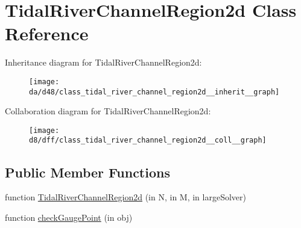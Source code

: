 \hypertarget{class_tidal_river_channel_region2d}{}\section{Tidal\+River\+Channel\+Region2d Class Reference}
\label{class_tidal_river_channel_region2d}


Inheritance diagram for Tidal\+River\+Channel\+Region2d\+:
\nopagebreak
\begin{figure}[H]
\begin{center}
\leavevmode
\texttt{[image: da/d48/class\_tidal\_river\_channel\_region2d\_\_inherit\_\_graph]}
\end{center}
\end{figure}


Collaboration diagram for Tidal\+River\+Channel\+Region2d\+:
\nopagebreak
\begin{figure}[H]
\begin{center}
\leavevmode
\texttt{[image: d8/dff/class\_tidal\_river\_channel\_region2d\_\_coll\_\_graph]}
\end{center}
\end{figure}
\subsection*{Public Member Functions}
\begin{DoxyCompactItemize}
\item 
function \hyperlink{class_tidal_river_channel_region2d_a419c7076668320e31b1bcc70c1420075}{Tidal\+River\+Channel\+Region2d} (in N, in M, in large\+Solver)
\item 
function \hyperlink{class_tidal_river_channel_region2d_a80388862d1d8c7e8b4cd933d8609898e}{check\+Gauge\+Point} (in obj)
\end{DoxyCompactItemize}
